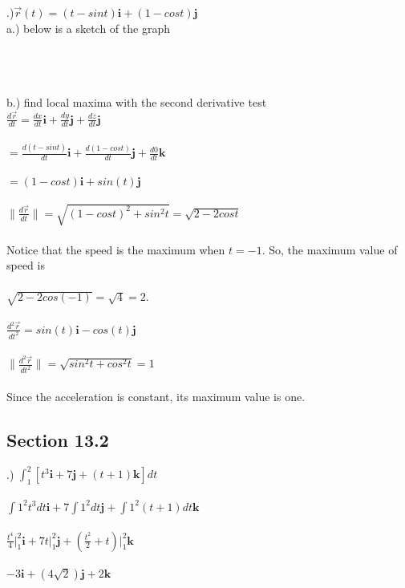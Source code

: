 \documentclass[12pt]{article}
\begin{document}
.)$\vec{r}(t) = (t - sin{t})\mathbf{i} + (1- cos{t})\mathbf{j}$\\
\noindent a.) below is a sketch of the graph\\\\
\\\\

\noindent b.) find local maxima with the second derivative test\\
\noindent $\frac{d\vec{r}}{dt} = \frac{dx}{dt}\mathbf{i} + \frac{dy}{dt}\mathbf{j} + \frac{dz}{dt}\mathbf{j}$\\\\
\noindent $=\frac{d(t - sin{t})}{dt}\mathbf{i} + \frac{d(1 - cos{t})}{dt}\mathbf{j} + \frac{d0}{dt}\mathbf{k}$\\\\
\noindent $ = (1 - cos{t})\mathbf{i} + sin(t)\mathbf{j}$\\\\
\noindent $\| \frac{d\vec{r}}{dt} \|  = \sqrt{(1 - cos{t})^{2} + sin^{2}{t}} = \sqrt{2 - 2cos{t}}$\\\\
\noindent Notice that the speed is the maximum when $t = -1$. So, the maximum value of speed is \\\\
\noindent $ \sqrt{2 - 2cos(-1)}   = \sqrt{4} = 2$.\\\\
\noindent $\frac{d^{2}\vec{r}}{dt^{2}} = sin(t)\mathbf{i} - cos(t)\mathbf{j}$\\\\
\noindent $\| \frac{d^{2}\vec{r}}{dt^{2}} \| = \sqrt{sin^{2}{t} + cos^{2}{t}} = 1$\\\\
\noindent Since the acceleration is constant, its maximum value is one. \clearpage


\subsection*{Section 13.2}
.) $\int_{1}^{2} [t^{3}\mathbf{i} + 7\mathbf{j} + (t + 1)\mathbf{k}]dt$\\\\
\noindent $\int{1}^{2}t^{3}dt\mathbf{i} + 7\int{1}^{2}dt\mathbf{j} + \int{1}^{2}(t + 1)dt\mathbf{k}$\\\\
\noindent $\frac{t^{4}}{4}\Big|_1^2\mathbf{i} + 7t\Big|_1^2\mathbf{j} + (\frac{t^{2}}{2} + t)\Big|_1^2\mathbf{k}$\\\\
\noindent $-3\mathbf{i} + (4\sqrt{2})\mathbf{j} + 2\mathbf{k}$\\\\
\end{document}
